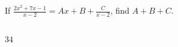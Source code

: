  
If {\Large $\frac{2x^2+7x-1}{x-2}$}$=Ax+B+${\Large$\frac{C}{x-2}$},
find $A+B+C$.\\\\


\ifsat
	\begin{enumerate}[label=\Alph*)]
	\end{enumerate}
\else
\fi

\ifacteven
	\begin{enumerate}[label=\textbf{\Alph*.},itemsep=\fill,align=left]
	\end{enumerate}
\else
\fi

\ifactodd
	\begin{enumerate}[label=\textbf{\Alph*.},itemsep=\fill,align=left]
	\end{enumerate}
\else
\fi

\ifgridin
$34 $
\else
\fi

